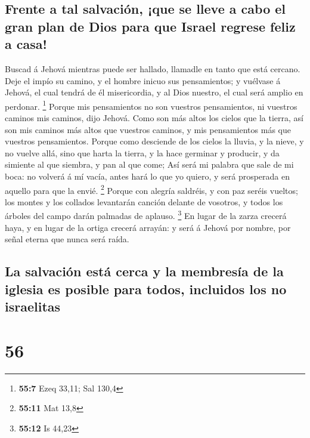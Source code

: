 \hypertarget{frente-a-tal-salvaciuxf3n-que-se-lleve-a-cabo-el-gran-plan-de-dios-para-que-israel-regrese-feliz-a-casa}{%
\subsection{Frente a tal salvación, ¡que se lleve a cabo el gran plan de
Dios para que Israel regrese feliz a
casa!}\label{frente-a-tal-salvaciuxf3n-que-se-lleve-a-cabo-el-gran-plan-de-dios-para-que-israel-regrese-feliz-a-casa}}

 Buscad á Jehová mientras puede ser hallado, llamadle en
tanto que está cercano.  Deje el impío su camino, y el
hombre inicuo sus pensamientos; y vuélvase á Jehová, el cual tendrá de
él misericordia, y al Dios nuestro, el cual será amplio en perdonar.
\footnote{\textbf{55:7} Ezeq 33,11; Sal 130,4}  Porque mis
pensamientos no son vuestros pensamientos, ni vuestros caminos mis
caminos, dijo Jehová.  Como son más altos los cielos que
la tierra, así son mis caminos más altos que vuestros caminos, y mis
pensamientos más que vuestros pensamientos.  Porque como
desciende de los cielos la lluvia, y la nieve, y no vuelve allá, sino
que harta la tierra, y la hace germinar y producir, y da simiente al que
siembra, y pan al que come;  Así será mi palabra que sale
de mi boca: no volverá á mí vacía, antes hará lo que yo quiero, y será
prosperada en aquello para que la envié. \footnote{\textbf{55:11} Mat
  13,8}  Porque con alegría saldréis, y con paz seréis
vueltos; los montes y los collados levantarán canción delante de
vosotros, y todos los árboles del campo darán palmadas de aplauso.
\footnote{\textbf{55:12} Is 44,23}  En lugar de la zarza
crecerá haya, y en lugar de la ortiga crecerá arrayán: y será á Jehová
por nombre, por señal eterna que nunca será raída.

\hypertarget{la-salvaciuxf3n-estuxe1-cerca-y-la-membresuxeda-de-la-iglesia-es-posible-para-todos-incluidos-los-no-israelitas}{%
\subsection{La salvación está cerca y la membresía de la iglesia es
posible para todos, incluidos los no
israelitas}\label{la-salvaciuxf3n-estuxe1-cerca-y-la-membresuxeda-de-la-iglesia-es-posible-para-todos-incluidos-los-no-israelitas}}

\hypertarget{section-55}{%
\section{56}\label{section-55}}

